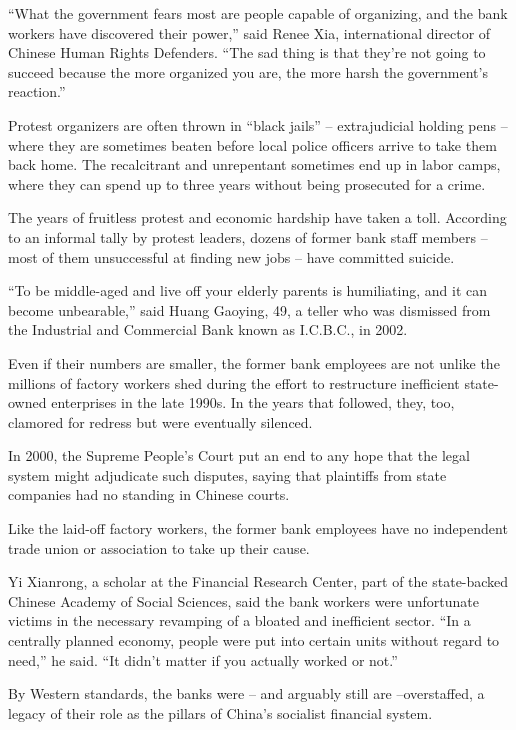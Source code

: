 ﻿\documentclass[12pt]{article}
\begin{document}
``What the government fears most are people capable of organizing, and the bank workers have
discovered their power,'' said Renee Xia, international director of Chinese Human Rights Defenders.
``The sad thing is that they're not going to succeed because the more organized you are, the more
harsh the government's reaction.''

Protest organizers are often thrown in ``black jails'' -- extrajudicial holding pens -- where they
are sometimes beaten before local police officers arrive to take them back home. The recalcitrant
and unrepentant sometimes end up in labor camps, where they can spend up to three years without
being prosecuted for a crime.

The years of fruitless protest and economic hardship have taken a toll. According to an informal
tally by protest leaders, dozens of former bank staff members -- most of them unsuccessful at
finding new jobs -- have committed suicide.

``To be middle-aged and live off your elderly parents is humiliating, and it can become
unbearable,'' said Huang Gaoying, 49, a teller who was dismissed from the Industrial and Commercial
Bank known as I.C.B.C., in 2002.

Even if their numbers are smaller, the former bank employees are not unlike the millions of factory
workers shed during the effort to restructure inefficient state-owned enterprises in the late 1990s.
In the years that followed, they, too, clamored for redress but were eventually silenced.

In 2000, the Supreme People's Court put an end to any hope that the legal system might adjudicate
such disputes, saying that plaintiffs from state companies had no standing in Chinese courts.

Like the laid-off factory workers, the former bank employees have no independent trade union or
association to take up their cause.

Yi Xianrong, a scholar at the Financial Research Center, part of the state-backed Chinese Academy of
Social Sciences, said the bank workers were unfortunate victims in the necessary revamping of a
bloated and inefficient sector. ``In a centrally planned economy, people were put into certain units
without regard to need,'' he said. ``It didn't matter if you actually worked or not.''

By Western standards, the banks were -- and arguably still are --overstaffed, a legacy of their role
as the pillars of China's socialist financial system.
\end{document}
